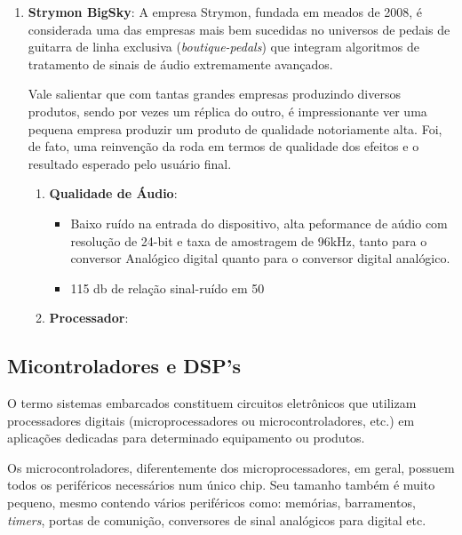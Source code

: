 \begin{enumerate}
				\item \textbf{Strymon BigSky}: A empresa Strymon, fundada em meados de 2008, é considerada uma das empresas mais bem sucedidas no universos de pedais de guitarra de linha exclusiva (\textit{boutique-pedals}) que integram algoritmos de tratamento de sinais de áudio extremamente avançados.
				
				Vale salientar que com tantas grandes empresas produzindo diversos produtos, sendo por vezes um réplica do outro, é impressionante ver uma pequena empresa produzir um produto de qualidade notoriamente alta. Foi, de fato, uma reinvenção da roda em termos de qualidade dos efeitos e o resultado esperado pelo usuário final.
				
				\begin{enumerate}
					\item \textbf{Qualidade de Áudio}: \begin{itemize}
						\item Baixo ruído na entrada do dispositivo, alta peformance de aúdio com resolução de 24-bit  e taxa de amostragem de 96kHz, tanto para o conversor Analógico digital quanto para o conversor digital analógico.
						\item 115 db de relação sinal-ruído em 50%
					\end{itemize}
					
					\item \textbf{Processador}:
				\end{enumerate}
				
				
				 
			\end{enumerate} 
		
	\subsection{Micontroladores e DSP's}

		O termo sistemas embarcados constituem circuitos eletrônicos que utilizam processadores digitais (microprocessadores ou microcontroladores, etc.) em aplicações dedicadas para determinado equipamento ou produtos.
		
		Os microcontroladores, diferentemente dos microprocessadores, em geral, possuem todos os periféricos necessários num único chip. Seu tamanho também é muito pequeno, mesmo contendo vários periféricos como: memórias, barramentos, \textit{timers}, portas de comunição, conversores de sinal analógicos para digital etc.
		
